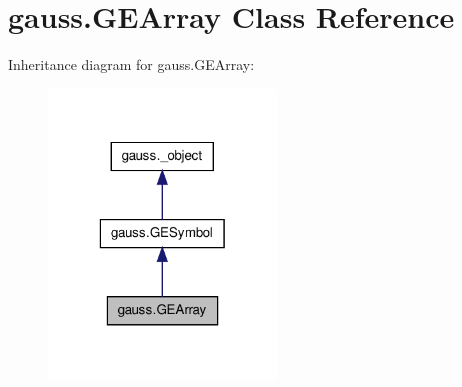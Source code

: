 \hypertarget{classgauss_1_1_g_e_array}{\section{gauss.\-G\-E\-Array Class Reference}
\label{classgauss_1_1_g_e_array}
}


Inheritance diagram for gauss.\-G\-E\-Array\-:\nopagebreak
\begin{figure}[H]
\begin{center}
\leavevmode
\includegraphics[width=172pt]{classgauss_1_1_g_e_array__inherit__graph}
\end{center}
\end{figure}
